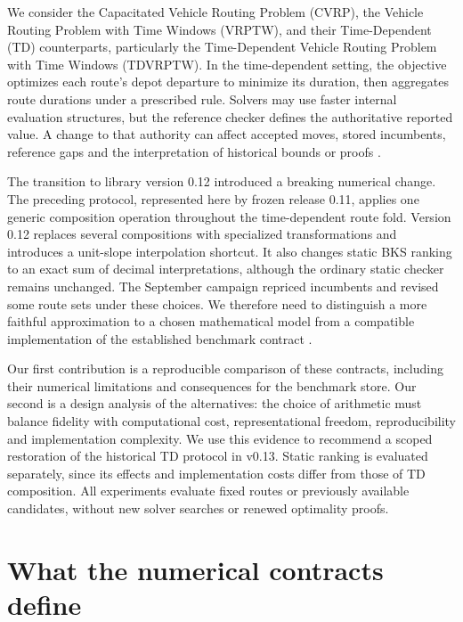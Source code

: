 \documentclass[11pt]{article}
\begin{document}
We consider the Capacitated Vehicle Routing Problem (CVRP), the Vehicle Routing Problem with Time Windows (VRPTW), and their Time-Dependent (TD) counterparts, particularly the Time-Dependent Vehicle Routing Problem with Time Windows (TDVRPTW). In the time-dependent setting, the objective optimizes each route's depot departure to minimize its duration, then aggregates route durations under a prescribed rule. Solvers may use faster internal evaluation structures, but the reference checker defines the authoritative reported value. A change to that authority can affect accepted moves, stored incumbents, reference gaps and the interpretation of historical bounds or proofs \autocite{rascoussierKAYROSTechReport2026,rascoussierKAYROSAnytimeExact2026,rascoussierAnytimeSolverEvaluation2026}.

The transition to library version 0.12 introduced a breaking numerical change. The preceding protocol, represented here by frozen release 0.11, applies one generic composition operation throughout the time-dependent route fold. Version 0.12 replaces several compositions with specialized transformations and introduces a unit-slope interpolation shortcut. It also changes static BKS ranking to an exact sum of decimal interpretations, although the ordinary static checker remains unchanged. The September campaign repriced incumbents and revised some route sets under these choices. We therefore need to distinguish a more faithful approximation to a chosen mathematical model from a compatible implementation of the established benchmark contract \autocite{mamutChecker0112026,mamutChecker0122026}.

Our first contribution is a reproducible comparison of these contracts, including their numerical limitations and consequences for the benchmark store. Our second is a design analysis of the alternatives: the choice of arithmetic must balance fidelity with computational cost, representational freedom, reproducibility and implementation complexity. We use this evidence to recommend a scoped restoration of the historical TD protocol in v0.13. Static ranking is evaluated separately, since its effects and implementation costs differ from those of TD composition. All experiments evaluate fixed routes or previously available candidates, without new solver searches or renewed optimality proofs.

\section{What the numerical contracts define}\label{sec:main-contracts}
\end{document}
